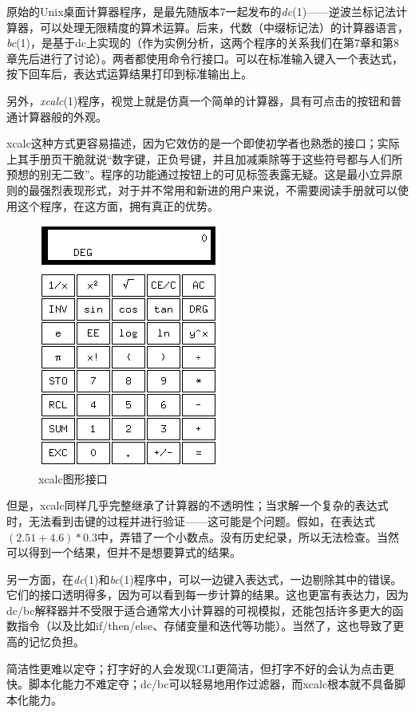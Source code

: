 \documentclass[12pt,oneside]{book}
\begin{document}
原始的Unix桌面计算器程序，是最先随版本7一起发布的\textit{dc}(1)——逆波兰标记法计算器，可以处理无限精度的算术运算。后来，代数（中缀标记法）的计算器语言，\textit{bc}(1)，是基于dc上实现的（作为实例分析，这两个程序的关系我们在第7章和第8章先后进行了讨论）。两者都使用命令行接口。可以在标准输入键入一个表达式，按下回车后，表达式运算结果打印到标准输出上。

另外，\textit{xcalc}(1)程序，视觉上就是仿真一个简单的计算器，具有可点击的按钮和普通计算器般的外观。

xcalc这种方式更容易描述，因为它效仿的是一个即使初学者也熟悉的接口；实际上其手册页干脆就说“数字键，正负号键，并且加减乘除等于这些符号都与人们所预想的别无二致”。程序的功能通过按钮上的可见标签表露无疑。这是最小立异原则的最强烈表现形式，对于并不常用和新进的用户来说，不需要阅读手册就可以使用这个程序，在这方面，拥有真正的优势。

\begin{figure}[H]
\centering
\caption{xcalc图形接口}
\includegraphics[scale=1 , keepaspectratio]{xcalc.png}
\end{figure}


但是，xcalc同样几乎完整继承了计算器的不透明性；当求解一个复杂的表达式时，无法看到击键的过程并进行验证——这可能是个问题。假如，在表达式$(2.51+4.6)*0.3$中，弄错了一个小数点。没有历史纪录，所以无法检查。当然可以得到一个结果，但并不是想要算式的结果。

另一方面，在\textit{dc}(1)和\textit{bc}(1)程序中，可以一边键入表达式，一边剔除其中的错误。它们的接口透明得多，因为可以看到每一步计算的结果。这也更富有表达力，因为dc/bc解释器并不受限于适合通常大小计算器的可视模拟，还能包括许多更大的函数指令（以及比如if/then/else、存储变量和迭代等功能）。当然了，这也导致了更高的记忆负担。

简洁性更难以定夺；打字好的人会发现CLI更简洁，但打字不好的会认为点击更快。脚本化能力不难定夺；dc/bc可以轻易地用作过滤器，而xcalc根本就不具备脚本化能力。
\end{document}
